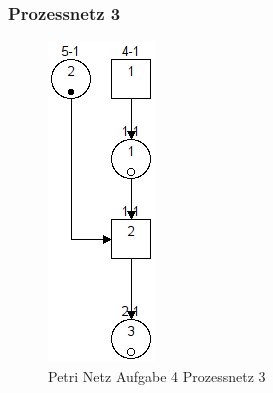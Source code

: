 \documentclass[10pt]{scrartcl}
\begin{document}
		\subsubsection{Prozessnetz 3}
			\begin{figure}[H]
    			\centering
				\includegraphics[]{aufg4Proc3.png}		
            	\caption{Petri Netz Aufgabe 4 Prozessnetz 3}
            	\label{petri:aufg4:pro3}
			\end{figure}		
\end{document}
